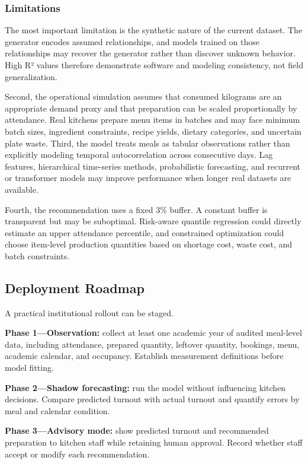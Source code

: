 \documentclass[conference]{IEEEtran}
\begin{document}
\subsubsection{Limitations}\label{limitations}

The most important limitation is the synthetic nature of the current
dataset. The generator encodes assumed relationships, and models trained
on those relationships may recover the generator rather than discover
unknown behavior. High R² values therefore demonstrate software and
modeling consistency, not field generalization.

Second, the operational simulation assumes that consumed kilograms are
an appropriate demand proxy and that preparation can be scaled
proportionally by attendance. Real kitchens prepare menu items in
batches and may face minimum batch sizes, ingredient constraints, recipe
yields, dietary categories, and uncertain plate waste. Third, the model
treats meals as tabular observations rather than explicitly modeling
temporal autocorrelation across consecutive days. Lag features,
hierarchical time-series methods, probabilistic forecasting, and
recurrent or transformer models may improve performance when longer real
datasets are available.

Fourth, the recommendation uses a fixed 3\% buffer. A constant buffer is
transparent but may be suboptimal. Risk-aware quantile regression could
directly estimate an upper attendance percentile, and constrained
optimization could choose item-level production quantities based on
shortage cost, waste cost, and batch constraints.

\subsection{Deployment Roadmap}\label{deployment-roadmap}

A practical institutional rollout can be staged.

\textbf{Phase 1---Observation:} collect at least one academic year of
audited meal-level data, including attendance, prepared quantity,
leftover quantity, bookings, menu, academic calendar, and occupancy.
Establish measurement definitions before model fitting.

\textbf{Phase 2---Shadow forecasting:} run the model without influencing
kitchen decisions. Compare predicted turnout with actual turnout and
quantify errors by meal and calendar condition.

\textbf{Phase 3---Advisory mode:} show predicted turnout and recommended
preparation to kitchen staff while retaining human approval. Record
whether staff accept or modify each recommendation.
\end{document}
